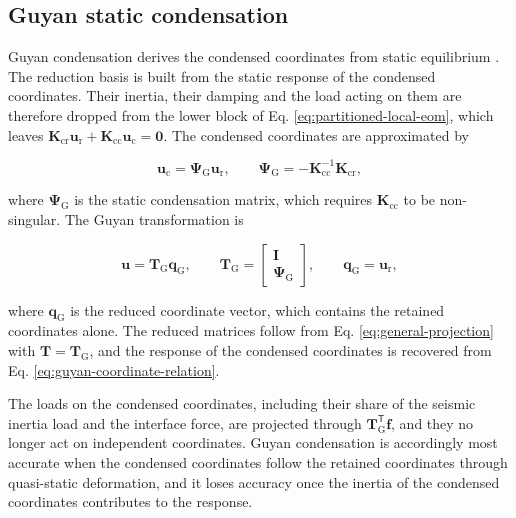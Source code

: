 \documentclass[a4paper,fleqn,review,12pt]{cas-sc}
\begin{document}
\subsection{Guyan static condensation} \label{sec21}

Guyan condensation derives the condensed coordinates from static equilibrium \cite{Guyan1965}. The reduction basis is built from the static response of the condensed coordinates. Their inertia, their damping and the load acting on them are therefore dropped from the lower block of Eq. \eqref{eq:partitioned-local-eom}, which leaves \(\mathbf{K}_{\mathrm{cr}}\bm{u}_{\mathrm{r}}+\mathbf{K}_{\mathrm{cc}}\bm{u}_{\mathrm{c}}=\bm{0}\). The condensed coordinates are approximated by

\vspace{-3.5em}
\begin{equation}
	\bm{u}_{\mathrm{c}}=\bm{\Psi}_{\mathrm{G}}\bm{u}_{\mathrm{r}},
	\qquad
	\bm{\Psi}_{\mathrm{G}}=-\mathbf{K}_{\mathrm{cc}}^{-1}\mathbf{K}_{\mathrm{cr}},
	\label{eq:guyan-coordinate-relation}
\end{equation}
\vspace{-3.5em}

\noindent where \(\bm{\Psi}_{\mathrm{G}}\) is the static condensation matrix, which requires \(\mathbf{K}_{\mathrm{cc}}\) to be non-singular.
The Guyan transformation is

\vspace{-3.5em}
\begin{equation}
	\bm{u}=\mathbf{T}_{\mathrm{G}}\bm{q}_{\mathrm{G}},
	\qquad
	\mathbf{T}_{\mathrm{G}}=
	\begin{bmatrix}
		\mathbf{I}\\
		\bm{\Psi}_{\mathrm{G}}
	\end{bmatrix},
	\qquad
	\bm{q}_{\mathrm{G}}=\bm{u}_{\mathrm{r}},
	\label{eq:guyan-transformation}
\end{equation}
\vspace{-3.0em}

\noindent where \(\bm{q}_{\mathrm{G}}\) is the reduced coordinate vector, which contains the retained coordinates alone. The reduced matrices follow from Eq. \eqref{eq:general-projection} with \(\mathbf{T}=\mathbf{T}_{\mathrm{G}}\), and the response of the condensed coordinates is recovered from Eq. \eqref{eq:guyan-coordinate-relation}.

The loads on the condensed coordinates, including their share of the seismic inertia load and the interface force, are projected through \(\mathbf{T}_{\mathrm{G}}^{\mathsf{T}}\bm{f}\), and they no longer act on independent coordinates. Guyan condensation is accordingly most accurate when the condensed coordinates follow the retained coordinates through quasi-static deformation, and it loses accuracy once the inertia of the condensed coordinates contributes to the response.
\end{document}
